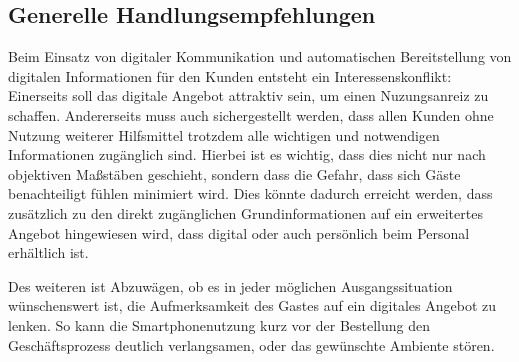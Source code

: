 
\subsection{Generelle Handlungsempfehlungen} %
\label{sub:psychologische_handlungsempfehlungen}
Beim Einsatz von digitaler Kommunikation und automatischen Bereitstellung von digitalen Informationen für den Kunden entsteht ein Interessenskonflikt: Einerseits soll das digitale Angebot attraktiv sein, um einen Nuzungsanreiz zu schaffen. Andererseits muss auch sichergestellt werden, dass allen Kunden ohne Nutzung weiterer Hilfsmittel trotzdem alle wichtigen und notwendigen Informationen zugänglich sind.
Hierbei ist es wichtig, dass dies nicht nur nach objektiven Maßstäben geschieht, sondern dass die Gefahr, dass sich Gäste benachteiligt fühlen minimiert wird. Dies könnte dadurch erreicht werden, dass zusätzlich zu den direkt zugänglichen Grundinformationen auf ein erweitertes Angebot hingewiesen wird, dass digital oder auch persönlich beim Personal erhältlich ist.

Des weiteren ist Abzuwägen, ob es in jeder möglichen Ausgangssituation wünschenswert ist, die Aufmerksamkeit des Gastes auf ein digitales Angebot zu lenken. So kann die Smartphonenutzung kurz vor der Bestellung den Geschäftsprozess deutlich verlangsamen, oder das gewünschte Ambiente stören. 


